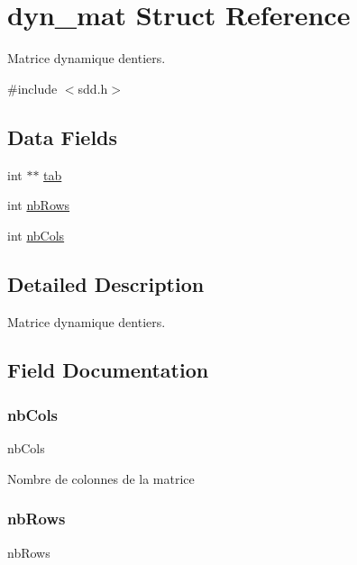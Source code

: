 \hypertarget{structdyn__mat}{}\section{dyn\+\_\+mat Struct Reference}
\label{structdyn__mat}


Matrice dynamique d\textquotesingle{}entiers.  




{\ttfamily \#include $<$sdd.\+h$>$}

\subsection*{Data Fields}
\begin{DoxyCompactItemize}
\item 
int $\ast$$\ast$ \hyperlink{structdyn__mat_af1ffd7c07d3cf727dfbec1ee327606fa}{tab}
\item 
int \hyperlink{structdyn__mat_a5d6e5f472f35cd5d4ef033b514c48861}{nb\+Rows}
\item 
int \hyperlink{structdyn__mat_ac54d0ebc8f0c91c94d6df9e5cf477441}{nb\+Cols}
\end{DoxyCompactItemize}


\subsection{Detailed Description}
Matrice dynamique d\textquotesingle{}entiers. 

\subsection{Field Documentation}
\mbox{\label{structdyn__mat_ac54d0ebc8f0c91c94d6df9e5cf477441}} 
\subsubsection{\texorpdfstring{nb\+Cols}{nbCols}}
{\footnotesize\ttfamily nb\+Cols}

Nombre de colonnes de la matrice \mbox{\label{structdyn__mat_a5d6e5f472f35cd5d4ef033b514c48861}} 
\subsubsection{\texorpdfstring{nb\+Rows}{nbRows}}
{\footnotesize\ttfamily nb\+Rows}

